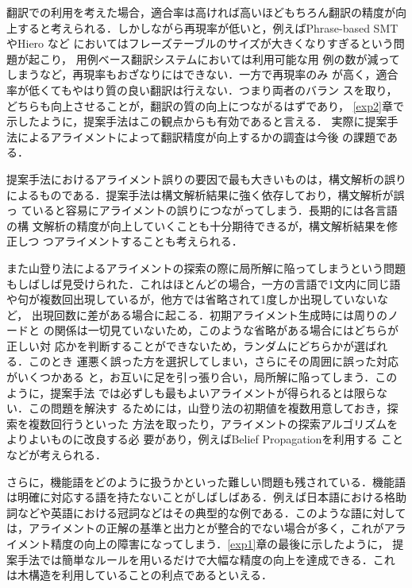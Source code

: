 \documentclass[japanese]{jnlp_1.4}
\begin{document}
翻訳での利用を考えた場合，適合率は高ければ高いほどもちろん翻訳の精度が向
上すると考えられる．しかしながら再現率が低いと，例えばPhrase-based
SMT \cite{koehn-och-marcu:2003:HLTNAACL}やHiero \cite{chiang:2005:ACL}など
においてはフレーズテーブルのサイズが大きくなりすぎるという問題が起こり，
用例ベース翻訳システム\cite{Nakazawa:2008:NTCIR7}においては利用可能な用
例の数が減ってしまうなど，再現率もおざなりにはできない．一方で再現率のみ
が高く，適合率が低くてもやはり質の良い翻訳は行えない．つまり両者のバラン
スを取り，どちらも向上させることが，翻訳の質の向上につながるはずであり，
\ref{exp2}章で示したように，提案手法はこの観点からも有効であると言える．
実際に提案手法によるアライメントによって翻訳精度が向上するかの調査は今後
の課題である．


提案手法におけるアライメント誤りの要因で最も大きいものは，構文解析の誤り
によるものである．提案手法は構文解析結果に強く依存しており，構文解析が誤っ
ていると容易にアライメントの誤りにつながってしまう．長期的には各言語の構
文解析の精度が向上していくことも十分期待できるが，構文解析結果を修正しつ
つアライメントすることも考えられる\cite{fraser-wang-schutze:2009:EACL}．

また山登り法によるアライメントの探索の際に局所解に陥ってしまうという問題
もしばしば見受けられた．これはほとんどの場合，一方の言語で1文内に同じ語
や句が複数回出現しているが，他方では省略されて1度しか出現していないなど，
出現回数に差がある場合に起こる．初期アライメント生成時には周りのノードと
の関係は一切見ていないため，このような省略がある場合にはどちらが正しい対
応かを判断することができないため，ランダムにどちらかが選ばれる．このとき
運悪く誤った方を選択してしまい，さらにその周囲に誤った対応がいくつかある
と，お互いに足を引っ張り合い，局所解に陥ってしまう．このように，提案手法
では必ずしも最もよいアライメントが得られるとは限らない．この問題を解決す
るためには，山登り法の初期値を複数用意しておき，探索を複数回行うといった
方法を取ったり，アライメントの探索アルゴリズムをよりよいものに改良する必
要があり，例えばBelief Propagationを利用する
\cite{cromieres-kurohashi:2009:EACL}ことなどが考えられる．

さらに，機能語をどのように扱うかといった難しい問題も残されている．機能語
は明確に対応する語を持たないことがしばしばある．例えば日本語における格助
詞などや英語における冠詞などはその典型的な例である．このような語に対して
は，アライメントの正解の基準と出力とが整合的でない場合が多く，これがアラ
イメント精度の向上の障害になってしまう．\ref{exp1}章の最後に示したように，
提案手法では簡単なルールを用いるだけで大幅な精度の向上を達成できる．これ
は木構造を利用していることの利点であるといえる．
\end{document}

